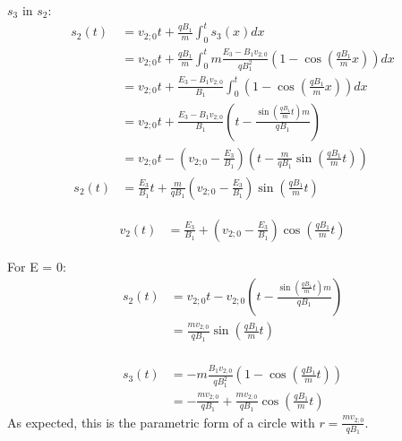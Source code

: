 \documentclass[a4paper, 10pt]{article}
\begin{document}
$s_3$ in $s_2$:
\begin{equation}
\begin{split}
s_2(t)  &= v_{2;0} t + \frac{q B_1}{m} \int_0^t s_3(x) dx	\\\
		&= v_{2;0} t + \frac{q B_1}{m} \int_0^t m \frac{E_3 - B_1 v_{2;0}}{q B_1^2} \left( 1 - \cos\left(\frac{q B_1}{m} x\right)\right) dx	\\\
		&= v_{2;0} t + \frac{E_3 - B_1 v_{2;0}}{B_1} \int_0^t \left( 1 - \cos\left(\frac{q B_1}{m} x\right)\right) dx	\\\
		&= v_{2;0} t + \frac{E_3 - B_1 v_{2;0}}{B_1} \left(t - \frac{\sin\left(\frac{q B_1}{m} t\right) m}{q B_1}\right) \\\
%
		&= v_{2;0} t - \left(v_{2;0} - \frac{E_3}{B_1}\right) \left(t - \frac{m}{q B_1} \sin\left(\frac{q B_1}{m} t\right) \right) \\\
%
s_2(t)	&= \frac{E_3}{B_1} t + \frac{m}{q B_1} \left(v_{2;0} - \frac{E_3}{B_1}\right) \sin\left(\frac{q B_1}{m} t\right)
\end{split}
\end{equation}

\begin{equation}
\begin{split}
v_2(t) &= \frac{E_3}{B_1} + \left(v_{2;0} - \frac{E_3}{B_1}\right) \cos\left(\frac{q B_1}{m} t\right)
\end{split}
\end{equation}

For E = 0:
\begin{equation}
\begin{split}
s_2(t) 	&= v_{2;0} t - v_{2;0} \left(t - \frac{\sin\left(\frac{q B_1}{m} t\right) m}{q B_1}\right) \\\
		&= \frac{m v_{2;0}}{q B_1} \sin\left(\frac{q B_1}{m} t\right) \\\
\end{split}
\end{equation}

\begin{equation}
\begin{split}
s_3(t) 	&= -m \frac{B_1 v_{2;0}}{q B_1^2} \left( 1 - \cos\left(\frac{q B_1}{m} t\right)\right) \\\
		&= -\frac{m v_{2;0}}{q B_1} + \frac{m v_{2;0}}{q B_1} \cos\left(\frac{q B_1}{m} t\right)
\end{split}
\end{equation}
As expected, this is the parametric form of a circle with $r = \frac{m v_{2;0}}{q B_1}$.
\end{document}

